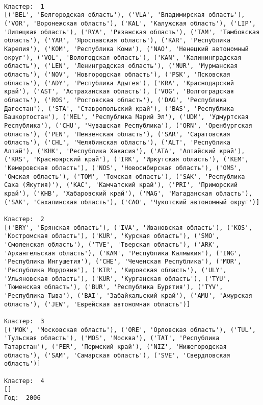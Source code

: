 \documentclass[11pt]{article}
\begin{document}
    \begin{Verbatim}[commandchars=\\\{\}]

Кластер:  1
[('BEL', 'Белгородская область'), ('VLA', 'Владимирская область'), ('VOR', 'Воронежская область'), ('KAL', 'Калужская область'), ('LIP', 'Липецкая область'), ('RYA', 'Рязанская область'), ('TAM', 'Тамбовская область'), ('YAR', 'Ярославская область'), ('KAR', 'Республика Карелия'), ('KOM', 'Республика Коми'), ('NAO', 'Ненецкий автономный округ'), ('VOL', 'Вологодская область'), ('KAN', 'Калинингpадская область'), ('LEN', 'Ленинградская область'), ('MUR', 'Мурманская область'), ('NOV', 'Новгородская область'), ('PSK', 'Псковская область'), ('ADY', 'Республика Адыгея'), ('KRA', 'Краснодарский край'), ('AST', 'Астраханская область'), ('VOG', 'Волгоградская область'), ('ROS', 'Ростовская область'), ('DAG', 'Республика Дагестан'), ('STA', 'Ставропольский край'), ('BAS', 'Республика Башкортостан'), ('MEL', 'Республика Марий Эл'), ('UDM', 'Удмуртская Республика'), ('CHU', 'Чувашская Республика'), ('ORN', 'Оренбургская область'), ('PEN', 'Пензенская область'), ('SAR', 'Саратовская область'), ('CHL', 'Челябинская область'), ('ALT', 'Республика Алтай'), ('KHK', 'Республика Хакасия'), ('ATA', 'Алтайский край'), ('KRS', 'Красноярский край'), ('IRK', 'Иркутская область'), ('KEM', 'Кемеровская область'), ('NOS', 'Новосибирская область'), ('OMS', 'Омская область'), ('TOM', 'Томская область'), ('SAK', 'Республика Саха (Якутия)'), ('KAC', 'Камчатский край'), ('PRI', 'Приморский край'), ('KHB', 'Хабаровский край'), ('MAG', 'Магаданская область'), ('SAK', 'Сахалинская область'), ('CAO', 'Чукотский автономный округ')]

Кластер:  2
[('BRY', 'Брянская область'), ('IVA', 'Ивановская область'), ('KOS', 'Костромская область'), ('KUR', 'Курская область'), ('SMO', 'Смоленская область'), ('TVE', 'Тверская область'), ('ARK', 'Архангельская область'), ('KAM', 'Республика Калмыкия'), ('ING', 'Республика Ингушетия'), ('CHE', 'Чеченская Республика'), ('MOR', 'Республика Мордовия'), ('KIR', 'Кировская область'), ('ULY', 'Ульяновская область'), ('KUR', 'Курганская область'), ('TYU', 'Тюменская область'), ('BUR', 'Республика Бурятия'), ('TYV', 'Республика Тыва'), ('BAI', 'Забайкальский край'), ('AMU', 'Амурская область'), ('JEW', 'Еврейская автономная область')]

Кластер:  3
[('MOK', 'Московская область'), ('ORE', 'Орловская область'), ('TUL', 'Тульская область'), ('MOS', 'Москва'), ('TAT', 'Республика Татарстан'), ('PER', 'Пермский край'), ('NIZ', 'Нижегородская область'), ('SAM', 'Самарская область'), ('SVE', 'Свердловская область')]

Кластер:  4
[]
Год:  2006

    \end{Verbatim}
\end{document}
